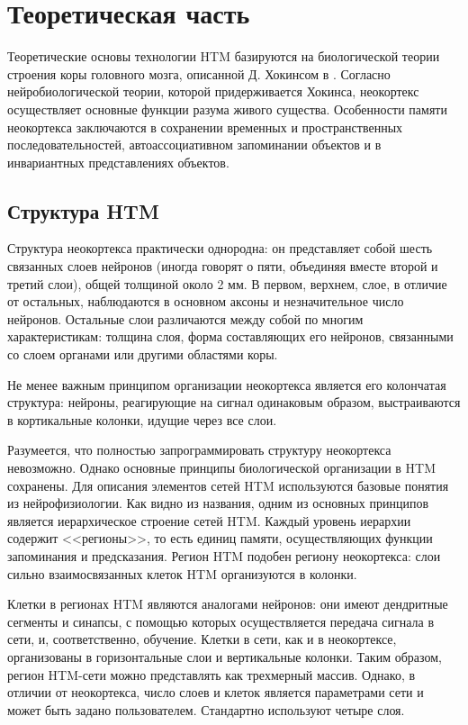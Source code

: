 \chapter{Теоретическая часть}\label{chp:theory}
Теоретические основы технологии HTM базируются на биологической теории строения коры головного мозга, описанной Д. Хокинсом в \cite{on_intelligence}. Согласно нейробиологической теории, которой придерживается Хокинса, неокортекс осуществляет основные функции разума живого существа. Особенности памяти неокортекса заключаются в сохранении временных и пространственных последовательностей, автоассоциативном запоминании объектов и в инвариантных представлениях объектов. 

\section{Структура HTM}\label{sec:theory_HTM_structure}
Структура неокортекса практически однородна: он представляет собой шесть связанных слоев нейронов (иногда говорят о пяти, объединяя вместе второй и третий слои), общей толщиной около 2 мм.  В первом, верхнем, слое, в отличие от остальных, наблюдаются в основном аксоны и незначительное число нейронов. Остальные слои различаются между собой по многим характеристикам: толщина слоя, форма составляющих его нейронов, связанными со слоем органами или другими областями коры.

Не менее важным принципом организации неокортекса является его колончатая структура: нейроны, реагирующие на сигнал одинаковым образом, выстраиваются  в кортикальные колонки, идущие через все слои.

Разумеется, что полностью запрограммировать структуру неокортекса невозможно. Однако основные принципы биологической организации в HTM сохранены.
Для описания элементов сетей HTM используются базовые понятия из нейрофизиологии. 
Как видно из названия, одним из основных принципов является иерархическое строение сетей HTM. Каждый уровень иерархии содержит <<регионы>>,  то есть единиц памяти, осуществляющих функции запоминания и предсказания. Регион HTM подобен региону неокортекса: слои сильно взаимосвязанных клеток HTM организуются в колонки.

Клетки в регионах HTM являются аналогами нейронов: они имеют дендритные сегменты и синапсы,  с помощью которых осуществляется передача сигнала в сети, и, соответственно, обучение.  Клетки в сети, как и в неокортексе, организованы в горизонтальные слои и вертикальные колонки. Таким образом, регион HTM-сети можно представлять как трехмерный массив. Однако, в отличии от неокортекса, число слоев и клеток является параметрами сети и может быть задано пользователем. Стандартно используют четыре слоя.

